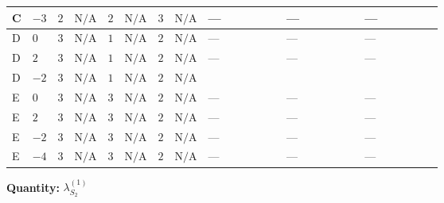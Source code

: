 \documentclass[8pt]{article}
\begin{document}
\begin{landscape}
\begin{longtable}{@{}llcccccc >{\raggedright\arraybackslash}p{0.21\linewidth} >{\raggedright\arraybackslash}p{0.21\linewidth} >{\raggedright\arraybackslash}p{0.21\linewidth}@{}}
\midrule
C & $-3$ & $2$ & $\text{N/A}$ & $2$ & $\text{N/A}$ & $3$ & $\text{N/A}$ & --- & --- & --- \\
\midrule
D & $0$ & $3$ & $\text{N/A}$ & $1$ & $\text{N/A}$ & $2$ & $\text{N/A}$ & --- & --- & --- \\
\midrule
D & $2$ & $3$ & $\text{N/A}$ & $1$ & $\text{N/A}$ & $2$ & $\text{N/A}$ & --- & --- & --- \\
\midrule
D & $-2$ & $3$ & $\text{N/A}$ & $1$ & $\text{N/A}$ & $2$ & $\text{N/A}$ & \scriptsize\adjustbox{max width=\linewidth}{$\begin{gathered} 288 {\lambda_{X_{1}}} \left({\lambda_{X_{1}}}\right)^{*}\end{gathered}$} & \scriptsize\adjustbox{max width=\linewidth}{$\begin{gathered} +108 {\lambda_{X_{2}}} \left({\lambda_{X_{2}}}\right)^{*}\end{gathered}$} & \scriptsize\adjustbox{max width=\linewidth}{$\begin{gathered} +12 {\lambda_{X_{7}}^{(1)}} \left({\lambda_{X_{7}}^{(1)}}\right)^{*}\end{gathered}$} \\
\midrule
E & $0$ & $3$ & $\text{N/A}$ & $3$ & $\text{N/A}$ & $2$ & $\text{N/A}$ & --- & --- & --- \\
\midrule
E & $2$ & $3$ & $\text{N/A}$ & $3$ & $\text{N/A}$ & $2$ & $\text{N/A}$ & --- & --- & --- \\
\midrule
E & $-2$ & $3$ & $\text{N/A}$ & $3$ & $\text{N/A}$ & $2$ & $\text{N/A}$ & --- & --- & --- \\
\midrule
E & $-4$ & $3$ & $\text{N/A}$ & $3$ & $\text{N/A}$ & $2$ & $\text{N/A}$ & --- & --- & --- \\
\midrule
\bottomrule
\end{longtable}
\clearpage
\noindent\textbf{Quantity: }$\lambda_{S_2}^{(1)}$\par\smallskip

\end{landscape}
\end{document}

